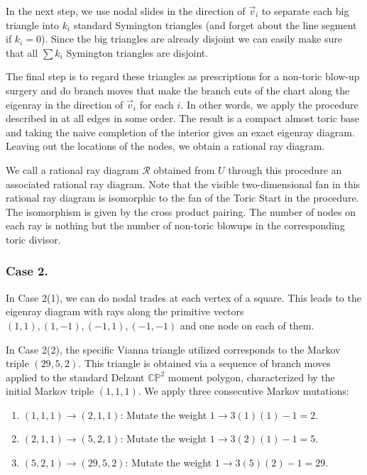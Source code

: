\documentclass[11pt, reqno]{amsart}
\theoremstyle{definition}
\begin{document}
In the next step, we use nodal slides in the direction of $\vec{v}_i$ to separate each big triangle into $k_i$ standard Symington triangles (and forget about the line segment if $k_i=0$). Since the big triangles are already disjoint we can easily make sure that all $\sum k_i$ Symington triangles are disjoint.

The final step is to regard these triangles as prescriptions for a non-toric blow-up surgery and do branch moves that make the branch cuts of the chart along the eigenray in the direction of $\vec{v}_i$ for each $i$. In other words, we apply the procedure described in \cite[Example 9.3]{Eva23} at all edges in some order. The result is a compact almost toric base and taking the naive completion of the interior gives an exact eigenray diagram. Leaving out the locations of the nodes, we obtain a rational ray diagram.

We call a rational ray diagram $\mathcal{R}$ obtained from $U$ through this procedure an associated rational ray diagram. Note that the visible two-dimensional fan in this rational ray diagram is isomorphic to the fan of the Toric Start in the procedure. The isomorphism is given by the cross product pairing. The number of nodes on each ray is nothing but the number of non-toric blowups in the corresponding toric divisor.


\FloatBarrier
\subsubsection{Case 2.}

In Case 2(1), we can do nodal trades at each vertex of a square. This leads to the eigenray diagram with rays along the primitive vectors $(1,1),(1,-1),(-1,1), (-1,-1)$ and one node on each of them.

In Case 2(2), the specific Vianna triangle utilized corresponds to the Markov triple $(29, 5, 2)$. This triangle is obtained via a sequence of branch moves applied to the standard Delzant $\mathbb{CP}^2$ moment polygon, characterized by the initial Markov triple $(1, 1, 1)$. We apply three consecutive Markov mutations:
\begin{enumerate}
    \item $(1, 1, 1) \to (2, 1, 1)$: Mutate the weight $1 \to 3(1)(1) - 1 = 2$.
    \item $(2, 1, 1) \to (5, 2, 1)$: Mutate the weight $1 \to 3(2)(1) - 1 = 5$.
    \item $(5, 2, 1) \to (29, 5, 2)$: Mutate the weight $1 \to 3(5)(2) - 1 = 29$.
\end{enumerate}
\end{document}
